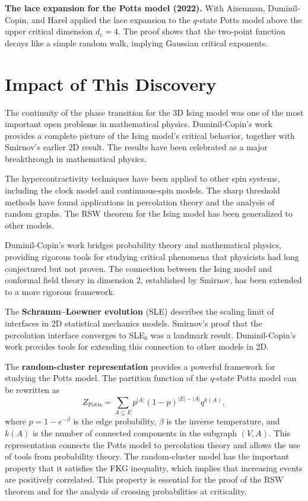 \textbf{The lace expansion for the Potts model (2022).} With Aizenman, Duminil-Copin, and Harel applied the lace expansion to the $q$-state Potts model above the upper critical dimension $d_c = 4$. The proof shows that the two-point function decays like a simple random walk, implying Gaussian critical exponents.

\section{Impact of This Discovery}

The continuity of the phase transition for the 3D Ising model was one of the most important open problems in mathematical physics. Duminil-Copin's work \cite{duminilcopin2016} provides a complete picture of the Ising model's critical behavior, together with Smirnov's earlier 2D result. The results have been celebrated as a major breakthrough in mathematical physics.

The hypercontractivity techniques have been applied to other spin systems, including the clock model and continuous-spin models. The sharp threshold methods have found applications in percolation theory and the analysis of random graphs. The RSW theorem for the Ising model has been generalized to other models.

Duminil-Copin's work \cite{duminilcopin2016} bridges probability theory and mathematical physics, providing rigorous tools for studying critical phenomena that physicists had long conjectured but not proven. The connection between the Ising model and conformal field theory in dimension 2, established by Smirnov, has been extended to a more rigorous framework.

The \textbf{Schramm--Loewner evolution} (SLE) describes the scaling limit of interfaces in 2D statistical mechanics models. Smirnov's proof that the percolation interface converges to SLE$_6$ was a landmark result. Duminil-Copin's work \cite{duminilcopin2016} provides tools for extending this connection to other models in 2D.

The \textbf{random-cluster representation} provides a powerful framework for studying the Potts model. The partition function of the $q$-state Potts model can be rewritten as
\[
Z_{\text{Potts}} = \sum_{A \subseteq E} p^{|A|}(1-p)^{|E|-|A|} q^{k(A)},
\]
where $p = 1 - e^{-\beta}$ is the edge probability, $\beta$ is the inverse temperature, and $k(A)$ is the number of connected components in the subgraph $(V, A)$. This representation connects the Potts model to percolation theory and allows the use of tools from probability theory. The random-cluster model has the important property that it satisfies the FKG inequality, which implies that increasing events are positively correlated. This property is essential for the proof of the RSW theorem and for the analysis of crossing probabilities at criticality.

